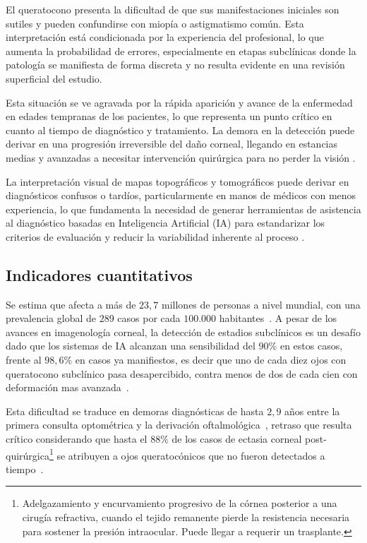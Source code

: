         El queratocono presenta la dificultad de que sus manifestaciones iniciales son sutiles y pueden confundirse con miopía o astigmatismo común. Esta interpretación está condicionada por la experiencia del profesional, lo que aumenta la probabilidad de errores, especialmente en etapas subclínicas donde la patología se manifiesta de forma discreta y no resulta evidente en una revisión superficial del estudio.
    
        Esta situación se ve agravada por la rápida aparición y avance de la enfermedad en edades tempranas de los pacientes, lo que representa un punto crítico en cuanto al tiempo de diagnóstico y tratamiento. La demora en la detección puede derivar en una progresión irreversible del daño corneal, llegando en estancias medias y avanzadas a necesitar intervención quirúrgica para no perder la visión .
        
        La interpretación visual de mapas topográficos y tomográficos puede derivar en diagnósticos confusos o tardíos, particularmente en manos de médicos con menos experiencia, lo que fundamenta la necesidad de generar herramientas de asistencia al diagnóstico basadas en Inteligencia Artificial (IA) para estandarizar los criterios de evaluación y reducir la variabilidad inherente al proceso .

    \subsection*{Indicadores cuantitativos}

        Se estima que afecta a más de $23,7$ millones de personas a nivel mundial, con una prevalencia global de $289$ casos por cada $100.000$ habitantes~. A pesar de los avances en imagenología corneal, la detección de estadios subclínicos es un desafío dado que los sistemas de IA alcanzan una sensibilidad del $90\%$ en estos casos, frente al $98,6\%$ en casos ya manifiestos, es decir que uno de cada diez ojos con queratocono subclínico pasa desapercibido, contra menos de dos de cada cien con deformación mas avanzada~.
        
        Esta dificultad se traduce en demoras diagnósticas de hasta $2,9$ años entre la primera consulta optométrica y la derivación oftalmológica~, retraso que resulta crítico considerando que hasta el $88\%$ de los casos de ectasia corneal post-quirúrgica\footnote{Adelgazamiento y encurvamiento progresivo de la córnea posterior a una cirugía refractiva, cuando el tejido remanente pierde la resistencia necesaria para sostener la presión intraocular. Puede llegar a requerir un trasplante.} se atribuyen a ojos queratocónicos que no fueron detectados a tiempo~.


